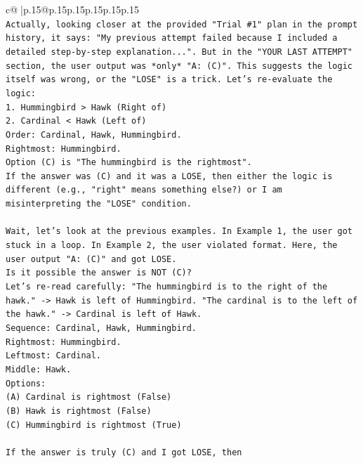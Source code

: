 \documentclass{article}
\begin{document}
{\begin{supertabular}{c@{$\;$}|p{.15\linewidth}@{}p{.15\linewidth}p{.15\linewidth}p{.15\linewidth}p{.15\linewidth}p{.15\linewidth}}
{{{\\ 
\texttt{Actually, looking closer at the provided "Trial \#1" plan in the prompt history, it says: "My previous attempt failed because I included a detailed step{-}by{-}step explanation...". But in the "YOUR LAST ATTEMPT" section, the user output was *only* "A: (C)". This suggests the logic itself was wrong, or the "LOSE" is a trick. Let's re{-}evaluate the logic:} \\
\texttt{1. Hummingbird > Hawk (Right of)} \\
\texttt{2. Cardinal < Hawk (Left of)} \\
\texttt{Order: Cardinal, Hawk, Hummingbird.} \\
\texttt{Rightmost: Hummingbird.} \\
\texttt{Option (C) is "The hummingbird is the rightmost".} \\
\texttt{If the answer was (C) and it was a LOSE, then either the logic is different (e.g., "right" means something else?) or I am misinterpreting the "LOSE" condition.} \\
\\ 
\texttt{Wait, let's look at the previous examples. In Example 1, the user got stuck in a loop. In Example 2, the user violated format. Here, the user output "A: (C)" and got LOSE.} \\
\texttt{Is it possible the answer is NOT (C)?} \\
\texttt{Let's re{-}read carefully: "The hummingbird is to the right of the hawk." {-}> Hawk is left of Hummingbird. "The cardinal is to the left of the hawk." {-}> Cardinal is left of Hawk.} \\
\texttt{Sequence: Cardinal, Hawk, Hummingbird.} \\
\texttt{Rightmost: Hummingbird.} \\
\texttt{Leftmost: Cardinal.} \\
\texttt{Middle: Hawk.} \\
\texttt{Options:} \\
\texttt{(A) Cardinal is rightmost (False)} \\
\texttt{(B) Hawk is rightmost (False)} \\
\texttt{(C) Hummingbird is rightmost (True)} \\
\\ 
\texttt{If the answer is truly (C) and I got LOSE, then} \\
\\ 
}}}
\end{supertabular}}
\end{document}
